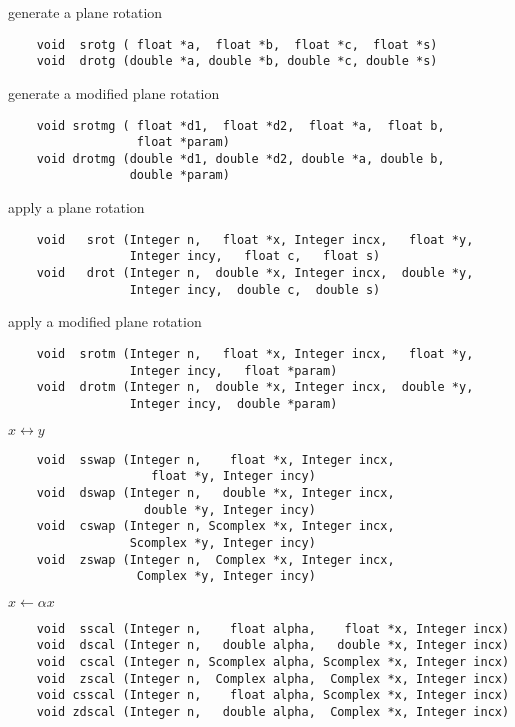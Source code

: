 \vspace{.5cm}
\noindent
generate a plane rotation
\footnotesize
\begin{verbatim}
    void  srotg ( float *a,  float *b,  float *c,  float *s)
    void  drotg (double *a, double *b, double *c, double *s) 
\end{verbatim}
\normalsize
generate a modified plane rotation
\footnotesize
\begin{verbatim}
    void srotmg ( float *d1,  float *d2,  float *a,  float b,
                  float *param)
    void drotmg (double *d1, double *d2, double *a, double b,
                 double *param) 
\end{verbatim}
\normalsize
apply a plane rotation
\footnotesize
\begin{verbatim}
    void   srot (Integer n,   float *x, Integer incx,   float *y,
                 Integer incy,   float c,   float s)
    void   drot (Integer n,  double *x, Integer incx,  double *y,
                 Integer incy,  double c,  double s) 
\end{verbatim}
\normalsize
apply a modified plane rotation
\footnotesize
\begin{verbatim}
    void  srotm (Integer n,   float *x, Integer incx,   float *y,
                 Integer incy,   float *param)
    void  drotm (Integer n,  double *x, Integer incx,  double *y,
                 Integer incy,  double *param)
\end{verbatim}
\normalsize
$x \leftrightarrow y$
\footnotesize
\begin{verbatim}
    void  sswap (Integer n,    float *x, Integer incx,
                    float *y, Integer incy)
    void  dswap (Integer n,   double *x, Integer incx,
                   double *y, Integer incy)
    void  cswap (Integer n, Scomplex *x, Integer incx,
                 Scomplex *y, Integer incy)
    void  zswap (Integer n,  Complex *x, Integer incx,
                  Complex *y, Integer incy)
\end{verbatim}
\normalsize
$x \leftarrow \alpha x$
\footnotesize
\begin{verbatim}
    void  sscal (Integer n,    float alpha,    float *x, Integer incx)
    void  dscal (Integer n,   double alpha,   double *x, Integer incx)
    void  cscal (Integer n, Scomplex alpha, Scomplex *x, Integer incx)
    void  zscal (Integer n,  Complex alpha,  Complex *x, Integer incx)
    void csscal (Integer n,    float alpha, Scomplex *x, Integer incx)
    void zdscal (Integer n,   double alpha,  Complex *x, Integer incx)
\end{verbatim}
